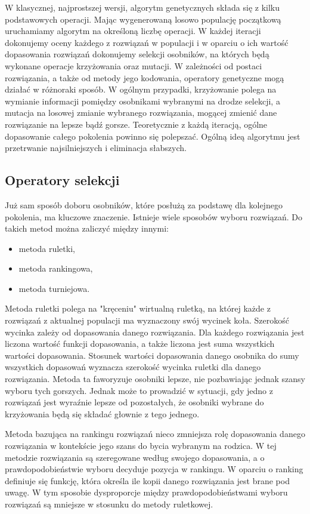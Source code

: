 W klasycznej, najprostszej wersji, algorytm genetycznych składa się z kilku podstawowych operacji. Mając wygenerowaną losowo populację początkową uruchamiamy algorytm na określoną liczbę operacji. W każdej iteracji dokonujemy oceny każdego z rozwiązań w populacji i w oparciu o ich wartość dopasowania rozwiązań dokonujemy selekcji osobników, na których będą wykonane operacje krzyżowania oraz mutacji. W zależności od postaci rozwiązania, a także od metody jego kodowania, operatory genetyczne mogą działać w różnoraki sposób. W ogólnym przypadki, krzyżowanie polega na wymianie informacji pomiędzy osobnikami wybranymi na drodze selekcji, a mutacja na losowej zmianie wybranego rozwiązania, mogącej zmienić dane rozwiązanie na lepsze bądź gorsze. Teoretycznie z każdą iteracją, ogólne dopasowanie całego pokolenia powinno się polepszać. Ogólną ideą algorytmu jest przetrwanie najsilniejszych i eliminacja słabszych.

\subsection{Operatory selekcji}
Już sam sposób doboru osobników, które posłużą za podstawę dla kolejnego pokolenia, ma kluczowe znaczenie. Istnieje wiele sposobów wyboru rozwiązań. Do takich metod można zaliczyć między innymi:
\begin{itemize}
\item metoda ruletki,
\item metoda rankingowa,
\item metoda turniejowa.
\end{itemize}

Metoda ruletki polega na "kręceniu" wirtualną ruletką, na której każde z rozwiązań z aktualnej populacji ma wyznaczony swój wycinek koła. Szerokość wycinka zależy od dopasowania danego rozwiązania. Dla każdego rozwiązania jest liczona wartość funkcji dopasowania, a także liczona jest suma wszystkich wartości dopasowania. Stosunek wartości dopasowania danego osobnika do sumy wszystkich dopasowań wyznacza szerokość wycinka ruletki dla danego rozwiązania. Metoda ta faworyzuje osobniki lepsze, nie pozbawiając jednak szansy wyboru tych gorszych. Jednak może to prowadzić w sytuacji, gdy jedno z rozwiązań jest wyraźnie lepsze od pozostałych, że osobniki wybrane do krzyżowania będą się składać głownie z tego jednego.

Metoda bazująca na rankingu rozwiązań nieco zmniejsza rolę dopasowania danego rozwiązania w kontekście jego szans do bycia wybranym na rodzica. W tej metodzie rozwiązania są szeregowane według swojego dopasowania, a o prawdopodobieństwie wyboru decyduje pozycja w rankingu. W oparciu o ranking definiuje się funkcję, która określa ile kopii danego rozwiązania jest brane pod uwagę. W tym sposobie dysproporcje między prawdopodobieństwami wyboru rozwiązań są mniejsze w stosunku do metody ruletkowej.


